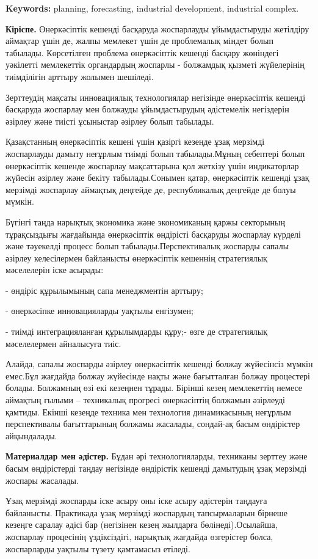 {\bfseries Keywords:} planning, forecasting, industrial development,
industrial complex.
\begin{multicols}{2}

{\bfseries Кіріспе.} Өнеркәсіптік кешенді басқаруда жоспарлауды
ұйымдастыруды жетілдіру аймақтар үшін де, жалпы мемлекет үшін де
проблемалық міндет болып табылады. Көрсетілген проблема өнеркәсіптік
кешенді басқару жөніндегі уәкілетті мемлекеттік органдардың жоспарлы -
болжамдық қызметі жүйелерінің тиімділігін арттыру жолымен шешіледі.

Зерттеудің мақсаты инновациялық технологиялар негізінде өнеркәсіптік
кешенді басқаруда жоспарлау мен болжауды ұйымдастырудың әдістемелік
негіздерін әзірлеу және тиісті ұсыныстар әзірлеу болып табылады.

Қазақстанның өнеркәсіптік кешені үшін қазіргі кезеңде ұзақ мерзімді
жоспарлауды дамыту неғұрлым тиімді болып табылады.Мұның себептері болып
өнеркәсіптік кешенде жоспарлау мақсаттарына қол жеткізу үшін
индикаторлар жүйесін әзірлеу және бекіту табылады.Сонымен қатар,
өнеркәсіптік кешенді ұзақ мерзімді жоспарлау аймақтық деңгейде де,
республикалық деңгейде де болуы мүмкін.

Бүгінгі таңда нарықтық экономика және экономиканың қаржы секторының
тұрақсыздығы жағдайында өнеркәсіптік өндірісті басқаруды жоспарлау
күрделі және тәуекелді процесс болып табылады.Перспективалық жоспарды
сапалы әзірлеу келесілермен байланысты өнеркәсіптік кешеннің
стратегиялық мәселелерін іске асырады:

- өндіріс құрылымының сапа менеджментін арттыру;

- өнеркәсіпке инновацияларды уақтылы енгізумен;

- тиімді интеграцияланған құрылымдарды құру;- өзге де стратегиялық
мәселелермен айналысуға тиіс.

Алайда, сапалы жоспарды әзірлеу өнеркәсіптік кешенді болжау жүйесінсіз
мүмкін емес.Бұл жағдайда болжау жүйесінде нақты және бағытталған болжау
процестері болады. Болжамның өзі екі кезеңнен тұрады. Бірінші кезең
мемлекеттің немесе аймақтың ғылыми -- техникалық прогресі өнеркәсіптің
болжамын әзірлеуді қамтиды. Екінші кезеңде техника мен технология
динамикасының неғұрлым перспективалы бағыттарының болжамы жасалады,
сондай-ақ басым өндірістер айқындалады.

{\bfseries Материалдар мен әдістер.} Бұдан әрі технологияларды, техниканы
зерттеу және басым өндірістерді таңдау негізінде өндірістік кешенді
дамытудың ұзақ мерзімді жоспары жасалады.

Ұзақ мерзімді жоспарды іске асыру оны іске асыру әдістерін таңдауға
байланысты. Практикада ұзақ мерзімді жоспардың тапсырмаларын бірнеше
кезеңге саралау әдісі бар (негізінен кезең жылдарға бөлінеді).Осылайша,
жоспарлау процесінің үздіксіздігі, нарықтық жағдайда өзгерістер болса,
жоспарларды уақтылы түзету қамтамасыз етіледі.

\end{multicols}

